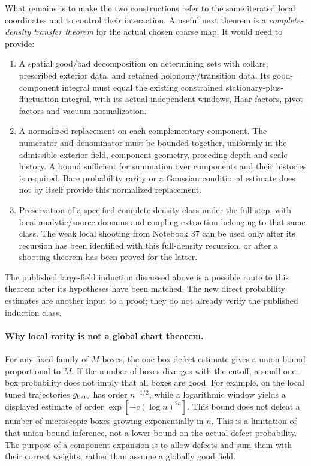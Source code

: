 \documentclass[11pt]{article}
\theoremstyle{remark}
\begin{document}
What remains is to make the two constructions refer to the same
iterated local coordinates and to control their interaction. A
useful next theorem is a \emph{complete-density transfer theorem}
for the actual chosen coarse map. It would need to provide:
\begin{enumerate}
\item A spatial good/bad decomposition on determining sets with
collars, prescribed exterior data, and retained holonomy/transition
data. Its good-component integral must equal the existing
constrained stationary-plus-fluctuation integral, with its actual
independent windows, Haar factors, pivot factors and vacuum
normalization.
\item A normalized replacement on each complementary component.
The numerator and denominator must be bounded together, uniformly
in the admissible exterior field, component geometry, preceding
depth and scale history. A bound sufficient for summation over
components and their histories is required. Bare probability
rarity or a Gaussian conditional estimate does not by itself
provide this normalized replacement.
\item Preservation of a specified complete-density class under the
full step, with local analytic/source domains and coupling
extraction belonging to that same class. The weak local shooting
from Notebook 37 can be used only after its recursion has been
identified with this full-density recursion, or after a shooting
theorem has been proved for the latter.
\end{enumerate}
The published large-field induction discussed above is a possible
route to this theorem after its hypotheses have been matched.
The new direct probability estimates are another input to a proof;
they do not already verify the published induction class.

\paragraph{Why local rarity is not a global chart theorem.}
For any fixed family of \(M\) boxes, the one-box defect estimate
gives a union bound proportional to \(M\). If the number of boxes
diverges with the cutoff, a small one-box probability does not
imply that all boxes are good. For example, on the local tuned
trajectories \(g_{\rm bare}\) has order \(n^{-1/2}\), while a
logarithmic window yields a displayed estimate of order
\(\exp[-c(\log n)^{2a}]\). This bound does not defeat a number
of microscopic boxes growing exponentially in \(n\). This is
a limitation of that union-bound inference, not a lower bound
on the actual defect probability. The purpose of a component
expansion is to allow defects and sum them with their correct
weights, rather than assume a globally good field.
\end{document}
